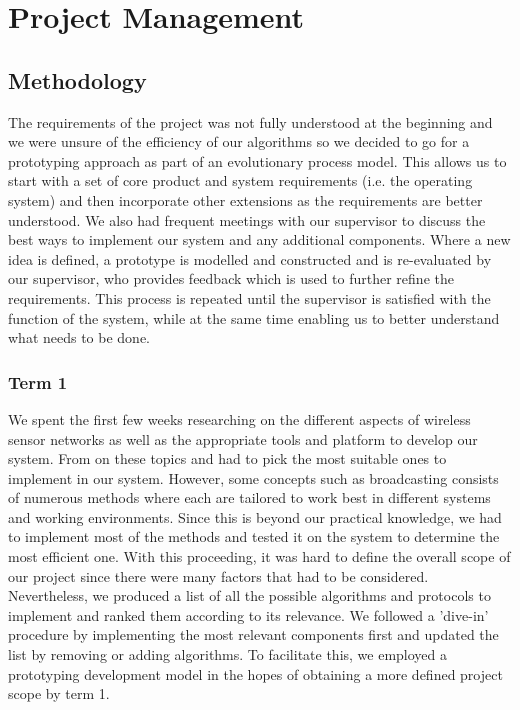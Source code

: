 \section{Project Management}

\subsection{Methodology}

The requirements of the project was not fully understood at the beginning and we were unsure of the efficiency of our algorithms so we decided to go for a prototyping approach as part of an evolutionary process model. This allows us to start with a set of core product and system requirements (i.e. the operating system) and then incorporate other extensions as the requirements are better understood. We also had frequent meetings with our supervisor to discuss the best ways to implement our system and any additional components. Where a new idea is defined, a prototype is modelled and constructed and is re-evaluated by our supervisor, who provides feedback which is used to further refine the requirements. This process is repeated until the supervisor is satisfied with the function of the system, while at the same time enabling us to better understand what needs to be done.

\subsubsection*{Term 1}

We spent the first few weeks researching on the different aspects of wireless sensor networks as well as the appropriate tools and platform to develop our system. From on these topics and had to pick the most suitable ones to implement in our system. However, some concepts such as broadcasting consists of numerous methods where each are tailored to work best in different systems and working environments. Since this is beyond our practical knowledge, we had to implement most of the methods and tested it on the system to determine the most efficient one. With this proceeding, it was hard to define the overall scope of our project since there were many factors that had to be considered. Nevertheless, we produced a list of all the possible algorithms and protocols to implement and ranked them according to its relevance. We followed a 'dive-in' procedure by implementing the most relevant components first and updated the list by removing or adding algorithms. To facilitate this, we employed a prototyping development model in the hopes of obtaining a more defined project scope by term 1.

